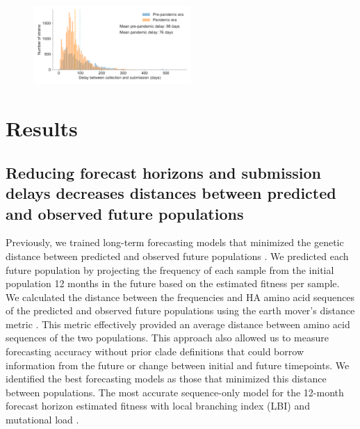 \documentclass[9pt,lineno]{elife}
\begin{document}
\begin{figure}[htb!]
{}\label{fig:model_of_delays_and_horizons}
%
{\includegraphics[width=6cm]{figures/distribution_of_delays_by_pandemic_era}}\label{figsupp:distribution_of_delays_by_pandemic_era}
\end{figure}

\section{Results}

\subsection{Reducing forecast horizons and submission delays decreases distances between predicted and observed future populations}

Previously, we trained long-term forecasting models that minimized the genetic distance between predicted and observed future populations \citep{Huddleston2020}.
We predicted each future population by projecting the frequency of each sample from the initial population 12 months in the future based on the estimated fitness per sample.
We calculated the distance between the frequencies and HA amino acid sequences of the predicted and observed future populations using the earth mover's distance metric \citep{Rubner1998}.
This metric effectively provided an average distance between amino acid sequences of the two populations.
This approach also allowed us to measure forecasting accuracy without prior clade definitions that could borrow information from the future or change between initial and future timepoints.
We identified the best forecasting models as those that minimized this distance between populations.
The most accurate sequence-only model for the 12-month forecast horizon estimated fitness with local branching index (LBI) \citep{Neher:2014eu} and mutational load \citep{Luksza:2014hj}.
\end{document}
